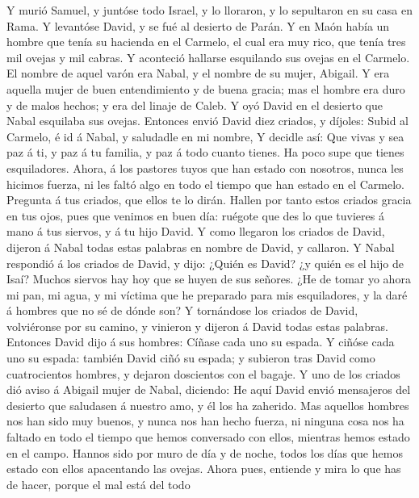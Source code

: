  Y murió Samuel, y juntóse todo Israel, y lo lloraron, y lo
sepultaron en su casa en Rama. Y levantóse David, y se fué al desierto
de Parán.  Y en Maón había un hombre que tenía su hacienda
en el Carmelo, el cual era muy rico, que tenía tres mil ovejas y mil
cabras. Y aconteció hallarse esquilando sus ovejas en el Carmelo.
 El nombre de aquel varón era Nabal, y el nombre de su
mujer, Abigail. Y era aquella mujer de buen entendimiento y de buena
gracia; mas el hombre era duro y de malos hechos; y era del linaje de
Caleb.  Y oyó David en el desierto que Nabal esquilaba sus
ovejas.  Entonces envió David diez criados, y díjoles: Subid
al Carmelo, é id á Nabal, y saludadle en mi nombre,  Y
decidle así: Que vivas y sea paz á ti, y paz á tu familia, y paz á todo
cuanto tienes.  Ha poco supe que tienes esquiladores. Ahora,
á los pastores tuyos que han estado con nosotros, nunca les hicimos
fuerza, ni les faltó algo en todo el tiempo que han estado en el
Carmelo.  Pregunta á tus criados, que ellos te lo dirán.
Hallen por tanto estos criados gracia en tus ojos, pues que venimos en
buen día: ruégote que des lo que tuvieres á mano á tus siervos, y á tu
hijo David.  Y como llegaron los criados de David, dijeron á
Nabal todas estas palabras en nombre de David, y callaron. 
Y Nabal respondió á los criados de David, y dijo: ¿Quién es David? ¿y
quién es el hijo de Isaí? Muchos siervos hay hoy que se huyen de sus
señores.  ¿He de tomar yo ahora mi pan, mi agua, y mi
víctima que he preparado para mis esquiladores, y la daré á hombres que
no sé de dónde son?  Y tornándose los criados de David,
volviéronse por su camino, y vinieron y dijeron á David todas estas
palabras.  Entonces David dijo á sus hombres: Cíñase cada
uno su espada. Y ciñóse cada uno su espada: también David ciñó su
espada; y subieron tras David como cuatrocientos hombres, y dejaron
doscientos con el bagaje.  Y uno de los criados dió aviso á
Abigail mujer de Nabal, diciendo: He aquí David envió mensajeros del
desierto que saludasen á nuestro amo, y él los ha zaherido.
 Mas aquellos hombres nos han sido muy buenos, y nunca nos
han hecho fuerza, ni ninguna cosa nos ha faltado en todo el tiempo que
hemos conversado con ellos, mientras hemos estado en el campo.
 Hannos sido por muro de día y de noche, todos los días que
hemos estado con ellos apacentando las ovejas.  Ahora pues,
entiende y mira lo que has de hacer, porque el mal está del todo
